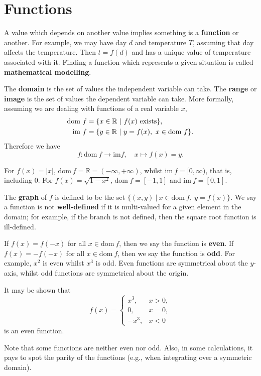 \documentclass[letter-paper]{tufte-book}
\newenvironment{example}[1][Example]{\begin{trivlist}
\item[\hskip \labelsep {\bfseries #1}]}{\end{trivlist}}
\newcommand\Def[1]{\textbf{#1}}
\begin{document}

\chapter{Functions}

A value which depends on another value implies something is a
\Def{function} or another. For example, we may have day $d$ and
temperature $T$, assuming that day affects the temperature. Then $t=f(d)$ and
has a unique value of temperature associated with it. Finding a function which
represents a given situation is called \Def{mathematical modelling}.

The \Def{domain} is the set of values the independent variable can
take. The \Def{range} or \Def{image} is the set of values the
dependent variable can take. More formally, assuming we are dealing with
functions of a real variable $x$,
\begin{align*}
  \mbox{dom}\ f &= \{x\in\mathbb{R}\ |\ f(x)\ \textnormal{exists}\},\\
  \mbox{im}\ f  &= \{y\in\mathbb{R}\ |\ y=f(x),\ x\in\mbox{dom}\ f\}.
\end{align*}
Therefore we have
\begin{equation*}
  f:\mbox{dom}\ f\rightarrow\mbox{im} f,\quad x\mapsto f(x)=y.
\end{equation*}
\begin{example}
  For $f(x)=|x|$, $\mbox{dom}\ f=\mathbb{R}=(-\infty,+\infty)$, whilst 
  $\mbox{im}\ f=[0,\infty)$, that is, including $0$. For $f(x)=\sqrt{1-x^2}$, 
  $\mbox{dom}\ f=[-1,1]$ and $\mbox{im}\ f=[0,1]$.
\end{example}

The \Def{graph} of $f$ is defined to be the set 
$\{(x,y)\ |\ x\in\mbox{dom}\ f,\ y=f(x)\}$. We say a function is not 
\Def{well-defined} if it is multi-valued for a given element in the 
domain; for example, if the branch is not defined, then the square root function 
is ill-defined.

If $f(x)=f(-x)$ for all $x\in\mbox{dom}\ f$, then we say the function is
\Def{even}. If $f(x)=-f(-x)$ for all $x\in\mbox{dom}\ f$, then we say
the function is \Def{odd}. For example, $x^2$ is even whilst $x^3$ is
odd. Even functions are symmetrical about the $y$-axis, whilst odd functions
are symmetrical about the origin.
\begin{example}
  It may be shown that
  \begin{equation*}
    f(x)=\begin{cases}x^3, & x>0,\\ 0, & x=0,\\ -x^3, & x<0\end{cases}
  \end{equation*}
  is an even function.
\end{example}
Note that some functions are neither even nor odd. Also, in some calculations,
it pays to spot the parity of the functions (e.g., when integrating over a
symmetric domain).
\end{document}

